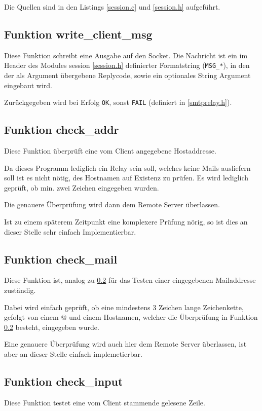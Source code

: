 \documentclass[pdftex,final,a4paper,10pt,notitlepage,halfparskip]{scrreprt}
\begin{document}
Die Quellen sind in den Listings \ref{session.c} und \ref{session.h} aufgeführt.

\subsection{Funktion write\_client\_msg}\label{fn:write_client_msg}
Diese Funktion schreibt eine Ausgabe auf den Socket. Die Nachricht ist ein im Header des Modules session \ref{session.h} definierter Formatstring (\texttt{MSG\_*}), in den der als Argument übergebene Replycode, sowie ein optionales String Argument eingebaut wird.

Zurückgegeben wird bei Erfolg \texttt{OK}, sonst \texttt{FAIL} (definiert in \ref{smtprelay.h}).

\subsection{Funktion check\_addr}\label{fn:check_addr}
Diese Funktion überprüft eine vom Client angegebene Hostaddresse. 

Da dieses Programm lediglich ein Relay sein soll, welches keine Mails ausliefern soll ist es nicht nötig, des Hostnamen auf Existenz zu prüfen. Es wird lediglich geprüft, ob min. zwei Zeichen eingegeben wurden. 

Die genauere Überprüfung wird dann dem Remote Server überlassen.

Ist zu einem späterem Zeitpunkt eine komplexere Prüfung nörig, so ist dies an dieser Stelle sehr einfach Implementierbar.

\subsection{Funktion check\_mail}\label{fn:check_mail}
Diese Funktion ist, analog zu \ref{fn:check_addr} für das Testen einer eingegebenen Mailaddresse zuständig. 

Dabei wird einfach geprüft, ob eine mindestens 3 Zeichen lange Zeichenkette, gefolgt von einem @ und einem Hostnamen, welcher die Überprüfung in Funktion \ref{fn:check_addr} besteht, eingegeben wurde.

Eine genauere Überprüfung wird auch hier dem Remote Server überlassen, ist aber an dieser Stelle einfach implemetierbar.

\subsection{Funktion check\_input}\label{fn:check_input}
Diese Funktion testet eine vom Client stammende gelesene Zeile.
\end{document}
